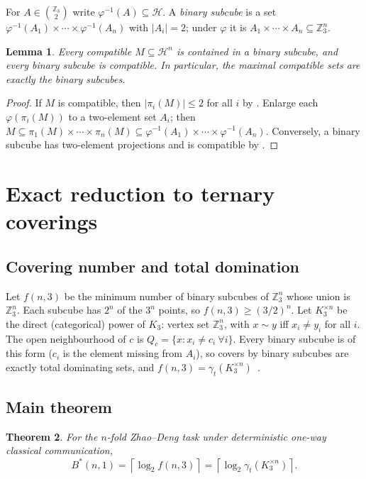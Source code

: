 \documentclass[12pt,a4paper]{article}
\newtheorem{theorem}{Theorem}
\newtheorem{lemma}[theorem]{Lemma}
\theoremstyle{definition}
\theoremstyle{remark}
\newcommand{\Z}{\mathbb{Z}}
\newcommand{\gammat}{\gamma_t}
\newcommand{\Bstar}{B^{*}}
\newcommand{\Hd}{\mathcal{H}}   %
\begin{document}
For $A\in\binom{\Z_3}{2}$ write $\varphi^{-1}(A)\subseteq\Hd$. A \emph{binary subcube} is a set $\varphi^{-1}(A_1)\times\cdots\times\varphi^{-1}(A_n)$ with $|A_i|=2$; under $\varphi$ it is $A_1\times\cdots\times A_n\subseteq\Z_3^n$.

\begin{lemma}
\label{lem:subcube}
Every compatible $M\subseteq\Hd^n$ is contained in a binary subcube, and every binary subcube is compatible. In particular, the maximal compatible sets are exactly the binary subcubes.
\end{lemma}

\begin{proof}
If $M$ is compatible, then $|\pi_i(M)|\le2$ for all $i$ by . Enlarge each $\varphi(\pi_i(M))$ to a two-element set $A_i$; then $M \subseteq \pi_1(M)\times\cdots\times\pi_n(M) \subseteq \varphi^{-1}(A_1)\times\cdots\times\varphi^{-1}(A_n)$. Conversely, a binary subcube has two-element projections and is compatible by .
\end{proof}

\section{Exact reduction to ternary coverings}
\label{sec:reduction}

\subsection{Covering number and total domination}

Let $f(n,3)$ be the minimum number of binary subcubes of $\Z_3^n$ whose union is $\Z_3^n$. Each subcube has $2^n$ of the $3^n$ points, so $f(n,3)\ge(3/2)^n$. Let $K_3^{\times n}$ be the direct (categorical) power of $K_3$: vertex set $\Z_3^n$, with $x\sim y$ iff $x_i\ne y_i$ for all $i$. The open neighbourhood of $c$ is $Q_c=\{x: x_i\neq c_i\ \forall i\}$. Every binary subcube is of this form ($c_i$ is the element missing from $A_i$), so covers by binary subcubes are exactly total dominating sets, and $f(n,3)=\gammat(K_3^{\times n})$~\cite{adriaensen2026,kuangwang2026}.

\subsection{Main theorem}

\begin{theorem}
\label{thm:main}
For the $n$-fold Zhao--Deng task under deterministic one-way classical communication,
\[
  \Bstar(n,1) = \left\lceil \log_2 f(n,3) \right\rceil = \left\lceil \log_2 \gammat(K_3^{\times n}) \right\rceil.
\]
\end{theorem}
\end{document}
